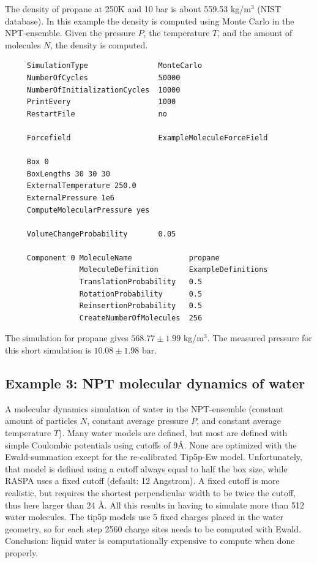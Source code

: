 The density of propane at 250K and 10 bar is about 559.53 kg/m$^3$ (NIST database). In this example the density is
computed using Monte Carlo in the NPT-ensemble. Given the pressure $P$, the temperature $T$, and the amount of molecules $N$,
the density is computed.

\begin{tiny}
\begin{verbatim}
     SimulationType                MonteCarlo
     NumberOfCycles                50000
     NumberOfInitializationCycles  10000
     PrintEvery                    1000
     RestartFile                   no
     
     Forcefield                    ExampleMoleculeForceField
     
     Box 0
     BoxLengths 30 30 30
     ExternalTemperature 250.0
     ExternalPressure 1e6
     ComputeMolecularPressure yes
     
     VolumeChangeProbability       0.05
     
     Component 0 MoleculeName             propane
                 MoleculeDefinition       ExampleDefinitions
                 TranslationProbability   0.5
                 RotationProbability      0.5
                 ReinsertionProbability   0.5
                 CreateNumberOfMolecules  256
\end{verbatim}
\end{tiny}
The simulation for propane gives $568.77\pm 1.99$ kg/m$^3$.
The measured pressure for this short simulation is $10.08\pm1.98$ bar.


\subsection*{Example 3: NPT molecular dynamics of water}
A molecular dynamics simulation of water in the NPT-ensemble
(constant amount of particles $N$, constant average pressure $P$, and constant average temperature $T$).
Many water models are defined, but most are defined with simple Coulombic potentials using cutoffs of 9\AA.
None are optimized with the Ewald-summation except for the re-calibrated Tip5p-Ew model.
Unfortunately, that model is defined using a cutoff always equal to half the box size, while
RASPA uses a fixed cutoff (default: 12 Angstrom). A fixed cutoff is more realistic, but requires the shortest
perpendicular width to be twice the cutoff, thus here larger than 24 \AA. All this results in having
to simulate more than 512 water molecules. The tip5p models use 5 fixed charges placed in the water geometry,
so for each step 2560 charge sites needs to be computed with Ewald. Conclusion: liquid water is computationally
expensive to compute when done properly.

